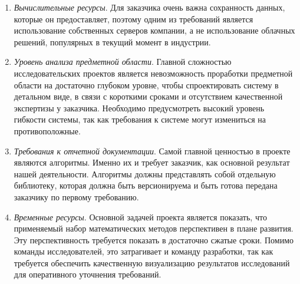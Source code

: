 \begin{enumerate}
    \item \textit{Вычислительные ресурсы}. Для заказчика очень важна сохранность данных,
    которые он предоставляет, поэтому одним из требований является использование собственных серверов компании,
    а не использование облачных решений, популярных в текущий момент в индустрии.

    \item \textit{Уровень анализа предметной области}. Главной сложностью исследовательских проектов является
    невозможность проработки предметной области на достаточно глубоком уровне, чтобы спроектировать систему в
    детальном виде, в связи с короткими сроками и отсутствием качественной экспертизы у заказчика. Необходимо
    предусмотреть высокий уровень гибкости системы, так как требования к системе могут измениться на противоположные.

    \item \textit{Требования к отчетной документации}. Самой главной ценностью в проекте являются алгоритмы. Именно их и
    требует заказчик, как основной результат нашей деятельности. Алгоритмы должны представлять собой отдельную библиотеку,
    которая должна быть версионируема и быть готова передана заказчику по первому требованию.

    \item \textit{Временные ресурсы}. Основной задачей проекта является показать, что применяемый набор математических
    методов перспективен в плане развития. Эту перспективность требуется показать в достаточно сжатые сроки. Помимо
    команды исследователей, это затрагивает и команду разработки, так как требуется обеспечить качественную визуализацию
    результатов исследований для оперативного уточнения требований.
\end{enumerate}
